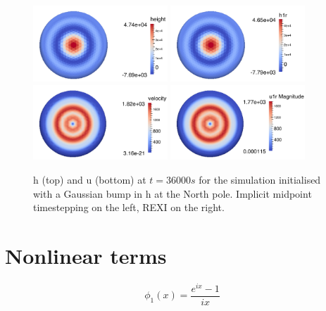 \documentclass[14pt]{article}
\begin{document}
\begin{figure}
  \centering
  \includegraphics[width=0.45\textwidth]{results/im_h_polar_t36000}
  \includegraphics[width=0.45\textwidth]{results/rexi_h_polar_t36000}\\
  \includegraphics[width=0.45\textwidth]{results/im_u_polar_t36000}
  \includegraphics[width=0.45\textwidth]{results/rexi_u_polar_t36000}\\
\caption{h (top) and u (bottom) at $t=36000s$ for the simulation initialised with a Gaussian bump in h at the North pole. Implicit midpoint timestepping on the left, REXI on the right.}
\label{polar_bump}
\end{figure}

\section{Nonlinear terms}

\begin{equation}
  \phi_1(x) = \frac{e^{i x}-1}{i x}
\end{equation}
\end{document}
